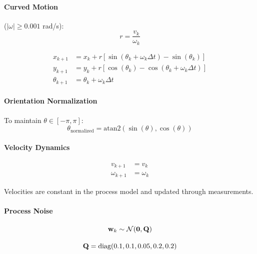 \paragraph{Curved Motion} ($|\omega| \geq 0.001$ rad/s):
\begin{equation}
r = \frac{v_k}{\omega_k}
\label{eq:turn_radius}
\end{equation}

\begin{equation}
\begin{aligned}
x_{k+1} &= x_k + r \left[ \sin(\theta_k + \omega_k \Delta t) - \sin(\theta_k) \right] \\
y_{k+1} &= y_k + r \left[ \cos(\theta_k) - \cos(\theta_k + \omega_k \Delta t) \right] \\
\theta_{k+1} &= \theta_k + \omega_k \Delta t
\end{aligned}
\label{eq:motion_curved}
\end{equation}

\paragraph{Orientation Normalization}
To maintain $\theta \in [-\pi, \pi]$:
\begin{equation}
\theta_{\text{normalized}} = \text{atan2}(\sin(\theta), \cos(\theta))
\label{eq:angle_normalization}
\end{equation}

\paragraph{Velocity Dynamics}
\begin{equation}
\begin{aligned}
v_{k+1} &= v_k \\
\omega_{k+1} &= \omega_k
\end{aligned}
\label{eq:velocity_dynamics}
\end{equation}

Velocities are constant in the process model and updated through measurements.

\paragraph{Process Noise}
\begin{equation}
\mathbf{w}_k \sim \mathcal{N}(\mathbf{0}, \mathbf{Q})
\label{eq:process_noise}
\end{equation}

\begin{equation}
\mathbf{Q} = \text{diag}(0.1, 0.1, 0.05, 0.2, 0.2)
\label{eq:process_noise_cov}
\end{equation}

